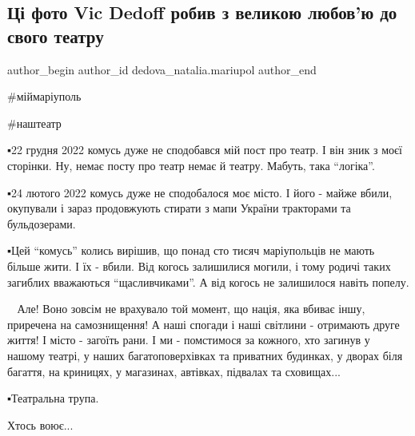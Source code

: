  
 
 
 
 

\subsection{Ці фото Vic Dedoff робив з великою любов'ю до свого театру}
\label{sec:23_12_2022.fb.dedova_natalia.mariupol.1.ts__foto_vic_dedoff_}

\ifcmt
 author_begin
   author_id dedova_natalia.mariupol
 author_end
\fi

\#міймаріуполь

\#наштеатр

▪️22 грудня 2022 комусь дуже не сподобався мій пост про театр. І він зник з моєї
сторінки. Ну, немає посту про театр немає й театру. Мабуть, така \enquote{логіка}. 

▪️24 лютого 2022 комусь дуже не сподобалося моє місто. І його - майже вбили,
окупували і зараз продовжують стирати з мапи України тракторами та
бульдозерами. 

▪️Цей \enquote{комусь} колись вирішив, що понад сто тисяч маріупольців не мають більше
жити. І їх - вбили. Від когось залишилися могили, і тому родичі таких загиблих
вважаються \enquote{щасливчиками}. А від когось не залишилося навіть попелу. 

💙💛 Але! Воно зовсім не врахувало той момент, що нація, яка вбиває іншу,
приречена на самознищення! А наші спогади і наші світлини - отримають друге
життя! І місто - загоїть рани. І ми - помстимося за кожного, хто загинув у
нашому театрі, у наших багатоповерхівках та приватних будинках, у дворах біля
багаття, на криницях, у магазинах, автівках, підвалах та сховищах...

▪️Театральна трупа. 

Хтось воює...

